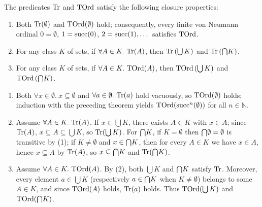 \documentclass[10pt,a4paper]{article}
\begin{document}
\begin{theorem}\label{thm:tord_closure}
The predicates ${\textrm{Tr}}$ and ${\textrm{TOrd}}$ satisfy the following closure properties:
\begin{enumerate}
\item Both ${\textrm{Tr}}(\emptyset)$ and ${\textrm{TOrd}}(\emptyset)$ hold; consequently, every finite von Neumann ordinal $0 = \emptyset$, $1 = {\textrm{succ}}(0)$, $2 = {\textrm{succ}}(1), \dots$ satisfies ${\textrm{TOrd}}$.
\item For any class $K$ of sets, if $\forall A \in K.\ \Tr(A)$, then ${\textrm{Tr}}\left(\bigcup K\right)$ and ${\textrm{Tr}}\left({\bigcap} K\right)$.
\item For any class $K$ of sets, if $\forall A \in K.\ \TOrd(A)$, then ${\textrm{TOrd}}\left(\bigcup K\right)$ and ${\textrm{TOrd}}\left({\bigcap} K\right)$.
\end{enumerate}
\end{theorem}
\myprf
\begin{enumerate}
\item Both $\forall x \in \emptyset.\ x \subseteq \emptyset$ and $\forall a \in \emptyset.\ {\textrm{Tr}}(a)$ hold vacuously, so ${\textrm{TOrd}}(\emptyset)$ holds; induction with the preceding theorem yields ${\textrm{TOrd}}({\textrm{succ}}^n(\emptyset))$ for all $n \in \mathbb{N}$.
\item Assume $\forall A \in K.\ \Tr(A)$. If $x \in \bigcup K$, there exists $A \in K$ with $x \in A$; since ${\textrm{Tr}}(A)$, $x \subseteq A \subseteq \bigcup K$, so ${\textrm{Tr}}(\bigcup K)$. For ${\bigcap} K$, if $K = \emptyset$ then ${\bigcap} \emptyset = \emptyset$ is transitive by (1); if $K \neq \emptyset$ and $x \in {\bigcap} K$, then for every $A \in K$ we have $x \in A$, hence $x \subseteq A$ by ${\textrm{Tr}}(A)$, so $x \subseteq {\bigcap} K$ and ${\textrm{Tr}}({\bigcap} K)$.
\item Assume $\forall A \in K.\ \TOrd(A)$. By (2), both $\bigcup K$ and ${\bigcap} K$ satisfy ${\textrm{Tr}}$. Moreover, every element $a \in \bigcup K$ (respectively $a \in {\bigcap} K$ when $K \neq \emptyset$) belongs to some $A \in K$, and since ${\textrm{TOrd}}(A)$ holds, ${\textrm{Tr}}(a)$ holds. Thus ${\textrm{TOrd}}(\bigcup K)$ and ${\textrm{TOrd}}({\bigcap} K)$.
\end{enumerate}
\myqed
\end{document}
